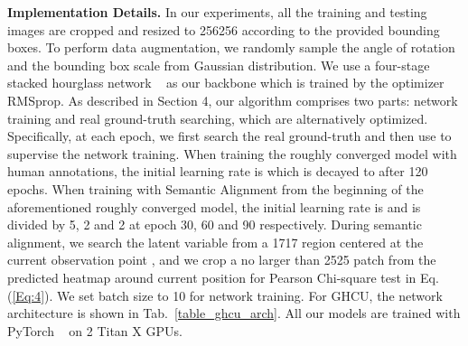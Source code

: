 \documentclass[10pt,twocolumn,letterpaper]{article}
\begin{document}
{{		\textbf{Implementation Details.}
		In our experiments, all the training and testing images are cropped and resized to 256256 according to the provided 
		bounding boxes. To perform data augmentation, we 
		randomly sample the angle of rotation and the bounding box scale from Gaussian distribution. We use a four-stage 
		stacked hourglass network ~\cite{newell2016stacked} as our backbone which is trained by the optimizer RMSprop. 
		{As described in Section 4}, our algorithm comprises two parts: network training and real ground-truth searching, which are alternatively optimized. Specifically, at each epoch, we first search the real ground-truth  and 
		then use  to supervise the network training. 
		{When training the roughly converged model with human annotations, the initial learning rate is  which is 
			decayed to  after 120 epochs. When training with Semantic Alignment from the beginning of the aforementioned 
			roughly converged model, the initial learning rate is  and is divided by 5, 2 and 2 at epoch 30, 60 and 
			90 respectively.
			During semantic alignment,  we search the latent variable  from a 1717 region centered at the current observation 
			point , and we crop a no larger than 2525 patch from the predicted heatmap around current position 
			for Pearson Chi-square test in Eq. (\ref{Eq:4}).}
		{We set batch size to 10} for network training. For GHCU, the network architecture is shown in Tab.~\ref{table_ghcu_arch}. 
		All our models are trained with PyTorch ~\cite{paszke2017automatic} on 2 Titan X GPUs. 
		
		
		
}}
\end{document}

